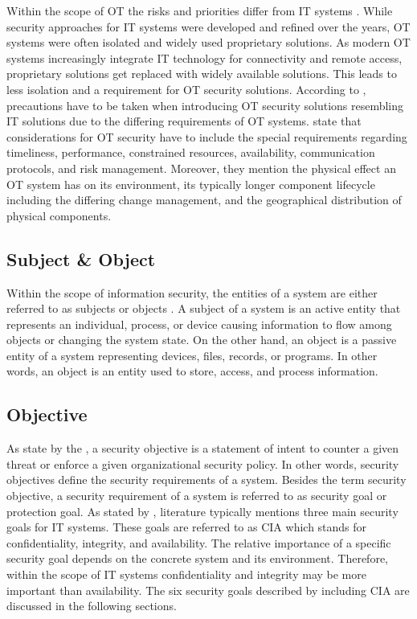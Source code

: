 Within the scope of OT the risks and priorities differ from IT systems \cite{Stouffer2023}.
While security approaches for IT systems were developed and refined over the years, OT systems were often isolated and widely used proprietary solutions.
As modern OT systems increasingly integrate IT technology for connectivity and remote access, proprietary solutions get replaced with widely available solutions.
This leads to less isolation and a requirement for OT security solutions.
According to \citeauthor{Stouffer2023}, precautions have to be taken when introducing OT security solutions resembling IT solutions due to the differing requirements of OT systems.
\citeauthor{Stouffer2023} state that considerations for OT security have to include the special requirements regarding timeliness, performance, constrained resources, availability, communication protocols, and risk management.
Moreover, they mention the physical effect an OT system has on its environment, its typically longer component lifecycle including the differing change management, and the geographical distribution of physical components.

\subsection{Subject \& Object}
Within the scope of information security, the entities of a system are either referred to as subjects or objects \cite{JTF2020}.
A subject of a system is an active entity that represents an individual, process, or device causing information to flow among objects or changing the system state. 
On the other hand, an object is a passive entity of a system representing devices, files, records, or programs.
In other words, an object is an entity used to store, access, and process information.

\subsection{Objective}
As state by the \citeauthor{nsa2009} \cite{nsa2009}, a security objective is a statement of intent to counter a given threat or enforce a given organizational security policy.
In other words, security objectives define the security requirements of a system.
Besides the term security objective, a security requirement of a system is referred to as security goal or protection goal.
As stated by \citeauthor{Eckert2023} \cite{Eckert2023}, literature typically mentions three main security goals for IT systems.
These goals are referred to as CIA which stands for confidentiality, integrity, and availability.
The relative importance of a specific security goal depends on the concrete system and its environment.
Therefore, within the scope of IT systems confidentiality and integrity may be more important than availability.
The six security goals described by \citeauthor{Eckert2023} including CIA are discussed in the following sections.

